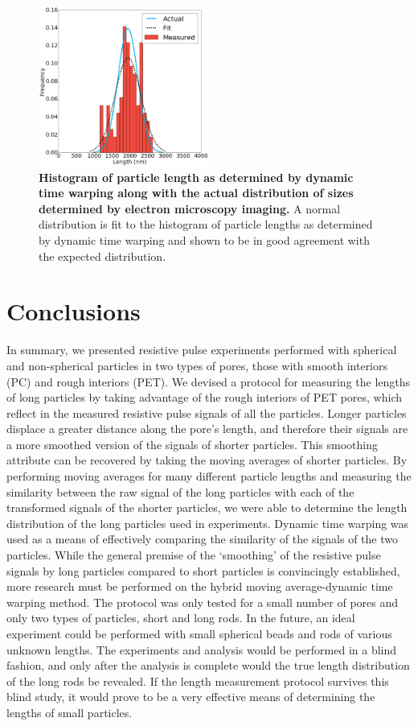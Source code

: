 		
		\begin{figure}
			\includegraphics[width=0.5\textwidth]{dtwfit.png}
			\caption{\textbf{Histogram of particle length as determined by dynamic time warping along with the actual distribution of sizes determined by electron microscopy imaging.} A normal distribution is fit to the histogram of particle lengths as determined by dynamic time warping and shown to be in good agreement with the expected distribution.}
			\label{fig:dtwfit}
		\end{figure}
		
	\section{Conclusions}
		In summary, we presented resistive pulse experiments performed with spherical and non-spherical particles in two types of pores, those with smooth interiors (PC) and rough interiors (PET). We devised a protocol for measuring the lengths of long particles by taking advantage of the rough interiors of PET pores, which reflect in the measured resistive pulse signals of all the particles. Longer particles displace a greater distance along the pore's length, and therefore their signals are a more smoothed version of the signals of shorter particles. This smoothing attribute can be recovered by taking the moving averages of shorter particles. By performing moving averages for many different particle lengths and measuring the similarity between the raw signal of the long particles with each of the transformed signals of the shorter particles, we were able to determine the length distribution of the long particles used in experiments. Dynamic time warping was used as a means of effectively comparing the similarity of the signals of the two particles. While the general premise of the `smoothing' of the resistive pulse signals by long particles compared to short particles is convincingly established, more research must be performed on the hybrid moving average-dynamic time warping method. The protocol was only tested for a small number of pores and only two types of particles, short and long rods. In the future, an ideal experiment could be performed with small spherical beads and rods of various unknown lengths. The experiments and analysis would be performed in a blind fashion, and only after the analysis is complete would the true length distribution of the long rods be revealed. If the length measurement protocol survives this blind study, it would prove to be a very effective means of determining the lengths of small particles.
		
